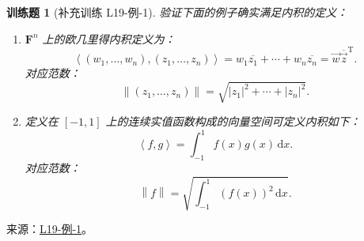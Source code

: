 \documentclass[12pt,fontset=fandol]{ctexart}
\newtheorem{exercise}{训练题}[section]
\begin{document}
\begin{exercise}[补充训练 L19-例-1]\label{prob:L19-例-1}
验证下面的例子确实满足内积的定义：
    \begin{enumerate}
        \item $\mathbf{F}^{n}$ 上的欧几里得内积定义为：
              \[\left\langle (w_1, \ldots, w_n), (z_1, \ldots, z_n)\right\rangle = w_1\overline{z_1} + \cdots + w_n\overline{z_n} = \vec{w}\overline{\vec{z}}^{\mathrm{T}}.\]
              对应范数：
              \[\left\lVert (z_1, \ldots, z_n) \right\rVert  = \sqrt{\lvert z_1 \rvert^2 + \cdots + \lvert z_n \rvert^2}.\]

        \item \label{item:23:内积和范数:2}
              定义在 $ \left[-1, 1\right] $ 上的连续实值函数构成的向量空间可定义内积如下：
              \[\left\langle f, g\right\rangle = \int_{-1}^1f(x)g(x)\,\mathrm{d}x.\]
              对应范数：
              \[\left\lVert f \right\rVert = \sqrt{\int_{-1}^1(f(x))^2\,\mathrm{d}x}.\]
    \end{enumerate}
\end{exercise}
\noindent 来源：\href{https://github.com/yhwu-is/Linear-Algebra-Left-Undone/blob/new/%E8%AE%B2%E4%B9%89/%E4%B8%93%E9%A2%98/19%20%E5%86%85%E7%A7%AF%E7%A9%BA%E9%97%B4.tex}{L19-例-1}。
\end{document}
